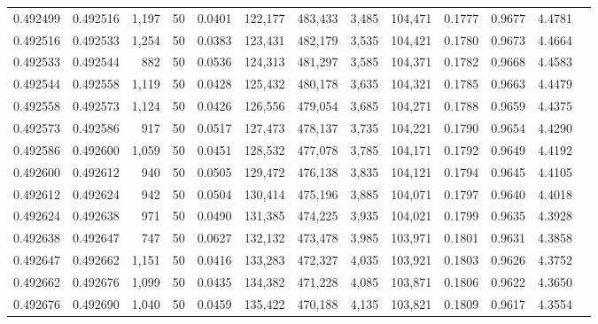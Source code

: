 \begin{tabular}{rrrrrrrrrrrrr}
0.492499 & 0.492516 & 1,197 &  50 &                                     0.0401 & 122,177 & 483,433 &   3,485 & 104,471 & 0.1777 & 0.9677 & 4.4781 \\
0.492516 & 0.492533 & 1,254 &  50 &                                     0.0383 & 123,431 & 482,179 &   3,535 & 104,421 & 0.1780 & 0.9673 & 4.4664 \\
0.492533 & 0.492544 &   882 &  50 &                                     0.0536 & 124,313 & 481,297 &   3,585 & 104,371 & 0.1782 & 0.9668 & 4.4583 \\
0.492544 & 0.492558 & 1,119 &  50 &                                     0.0428 & 125,432 & 480,178 &   3,635 & 104,321 & 0.1785 & 0.9663 & 4.4479 \\
0.492558 & 0.492573 & 1,124 &  50 &                                     0.0426 & 126,556 & 479,054 &   3,685 & 104,271 & 0.1788 & 0.9659 & 4.4375 \\
0.492573 & 0.492586 &   917 &  50 &                                     0.0517 & 127,473 & 478,137 &   3,735 & 104,221 & 0.1790 & 0.9654 & 4.4290 \\
0.492586 & 0.492600 & 1,059 &  50 &                                     0.0451 & 128,532 & 477,078 &   3,785 & 104,171 & 0.1792 & 0.9649 & 4.4192 \\
0.492600 & 0.492612 &   940 &  50 &                                     0.0505 & 129,472 & 476,138 &   3,835 & 104,121 & 0.1794 & 0.9645 & 4.4105 \\
0.492612 & 0.492624 &   942 &  50 &                                     0.0504 & 130,414 & 475,196 &   3,885 & 104,071 & 0.1797 & 0.9640 & 4.4018 \\
0.492624 & 0.492638 &   971 &  50 &                                     0.0490 & 131,385 & 474,225 &   3,935 & 104,021 & 0.1799 & 0.9635 & 4.3928 \\
0.492638 & 0.492647 &   747 &  50 &                                     0.0627 & 132,132 & 473,478 &   3,985 & 103,971 & 0.1801 & 0.9631 & 4.3858 \\
0.492647 & 0.492662 & 1,151 &  50 &                                     0.0416 & 133,283 & 472,327 &   4,035 & 103,921 & 0.1803 & 0.9626 & 4.3752 \\
0.492662 & 0.492676 & 1,099 &  50 &                                     0.0435 & 134,382 & 471,228 &   4,085 & 103,871 & 0.1806 & 0.9622 & 4.3650 \\
0.492676 & 0.492690 & 1,040 &  50 &                                     0.0459 & 135,422 & 470,188 &   4,135 & 103,821 & 0.1809 & 0.9617 & 4.3554 \\

\end{tabular}
